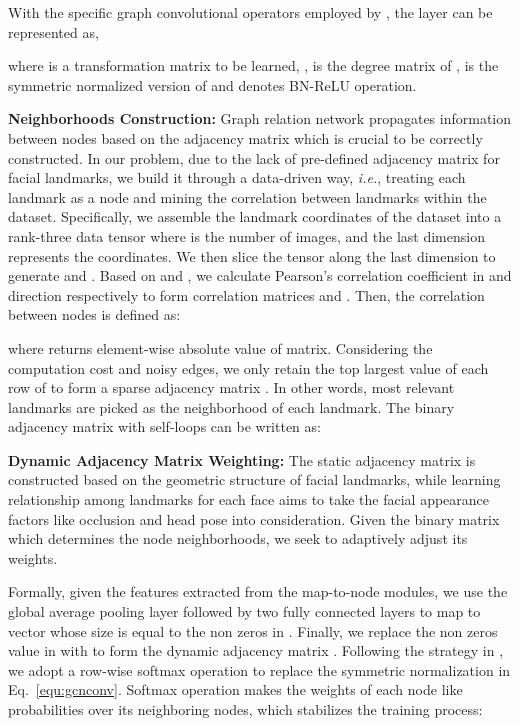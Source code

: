 \documentclass[runningheads]{llncs}
\begin{document}
With the specific graph convolutional operators employed by \cite{SemiGraph}, the layer can be represented as,

where  is a transformation matrix to be learned, ,  is the degree matrix of ,  is the symmetric normalized version of  and  denotes BN-ReLU operation.


\textbf{Neighborhoods Construction:} 
Graph relation network propagates information between nodes based on the adjacency matrix which is crucial to be correctly constructed. 
In our problem, due to the lack of pre-defined adjacency matrix for facial landmarks, we build it through a data-driven way, \textit{i.e.}, treating each landmark as a node and mining the correlation between landmarks within the dataset. 
Specifically, we assemble the landmark coordinates of the dataset into a rank-three data tensor  where  is the number of images, and the last dimension represents the  coordinates.
We then slice the tensor  along the last dimension to generate  and . Based on  and , we calculate Pearson's correlation coefficient in  and  direction respectively to form correlation matrices  and .
Then, the correlation between nodes is defined as:

where  returns element-wise absolute value of matrix. 
Considering the computation cost and noisy edges, we only retain the top  largest value of each row of  to form a sparse adjacency matrix . 
In other words, most  relevant landmarks are picked as the neighborhood of each landmark. The binary adjacency matrix with self-loops can be written as:




\textbf{Dynamic Adjacency Matrix Weighting:} 
The static adjacency matrix   is constructed based on the geometric structure of facial landmarks, while learning
relationship among landmarks for each face aims to take the facial appearance factors like occlusion and head pose into consideration. Given the binary matrix  which determines the node neighborhoods, we seek to adaptively adjust its weights.

Formally, given the features  extracted from the map-to-node modules, we use the global average pooling layer followed by two fully connected layers to 
map  to vector  whose size is equal to the non zeros in . Finally, we replace the non zeros value in  with  to form the dynamic adjacency matrix . 
Following the strategy in \cite{zhaoCVPR19semantic}, we adopt a row-wise softmax operation  to replace the symmetric normalization in Eq.~\ref{equ:gcnconv}.
Softmax operation makes the weights of each node like probabilities over its neighboring nodes, which stabilizes the training process:
\end{document}
